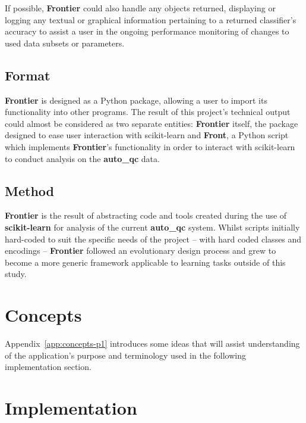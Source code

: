 If possible, \textbf{Frontier} could also handle any objects returned, displaying or
logging any textual or graphical information pertaining to a returned
classifier's accuracy to assist a user in the ongoing performance monitoring of
changes to used data subsets or parameters.


\subsection{Format}

\textbf{Frontier} is designed as a Python package, allowing a user to import its
functionality into other programs. The result of this project's technical
output could almost be considered as two separate entities: \textbf{Frontier} itself, the
package designed to ease user interaction with scikit-learn and \textbf{Front},
a Python script which implements \textbf{Frontier}'s functionality in order to interact
with scikit-learn to conduct analysis on the \textbf{auto\_qc} data.


\subsection{Method}
\label{sec:frontier-method}

\textbf{Frontier} is the result of abstracting code and tools created during
the use of \textbf{scikit-learn} for analysis of the current \textbf{auto\_qc}
system. Whilst scripts initially hard-coded to suit the specific needs of the
project -- with hard coded classes and encodings -- \textbf{Frontier} followed
an evolutionary design process and grew to become a more generic framework
applicable to learning tasks outside of this study.


\section{Concepts}

Appendix~\ref{app:concepts-p1} introduces some ideas that will assist
understanding of the application's purpose and terminology used in the following
implementation section.

\pagebreak
\section{Implementation}

